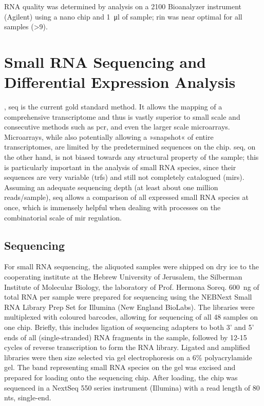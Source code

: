 \begin{method}
RNA quality was determined by analysis on a 2100 Bioanalyzer instrument (Agilent) using a nano chip and \SI{1}{\micro\litre} of sample; \ac{rin} was near optimal for all samples (>9).

\newpage

\section[Small RNA Sequencing and Differential Expression Analysis]{Small RNA Sequencing and \\Differential Expression Analysis}
, \ac{seq} is the current gold standard method. It allows the mapping of a comprehensive transcriptome and thus is vastly superior to small scale and consecutive methods such as \ac{pcr}, and even the larger scale microarrays. Microarrays, while also potentially allowing a »snapshot« of entire transcriptomes, are limited by the predetermined sequences on the chip. \ac{seq}, on the other hand, is not biased towards any structural property of the sample; this is particularly important in the analysis of small RNA species, since their sequences are very variable (\acp{trf}) and still not completely catalogued (\acp{mir}). Assuming an adequate sequencing depth (at least about one million reads/sample), \ac{seq} allows a comparison of all expressed small RNA species at once, which is immensely helpful when dealing with processes on the combinatorial scale of \ac{mir} regulation.

\subsection{Sequencing} \label{sec:cellculture:sequencing}

For small RNA sequencing, the aliquoted samples were shipped on dry ice to the cooperating institute at the Hebrew University of Jerusalem, the Silberman Institute of Molecular Biology, the laboratory of Prof. Hermona Soreq. \SI{600}{\nano\gram} of total RNA per sample were prepared for sequencing using the NEBNext Small RNA Library Prep Set for Illumina (New England BioLabs). The libraries were multiplexed with coloured barcodes, allowing for sequencing of all 48 samples on one chip. Briefly, this includes ligation of sequencing adapters to both 3' and 5' ends of all (single-stranded) RNA fragments in the sample, followed by 12-15 cycles of reverse transcription to form the RNA library. Ligated and amplified libraries were then size selected via gel electrophoresis on a 6\% polyacrylamide gel. The band representing small RNA species on the gel was excised and prepared for loading onto the sequencing chip. After loading, the chip was sequenced in a NextSeq 550 series instrument (Illumina) with a read length of 80 \acfp{nt}, single-end. 


\end{method}
